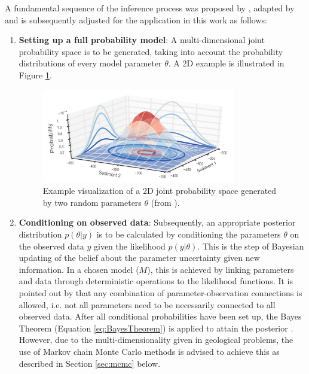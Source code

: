         A fundamental sequence of the inference process was proposed by \citet{gelman2014bayesian}, adapted by \citet{delaVarga2016} and is subsequently adjusted for the application in this work as follows:
        \begin{enumerate}
        	\item \textbf{Setting up a full probability model}: A multi-dimensional joint probability space is to be generated, taking into account the probability distributions of every model parameter $\theta$. A 2D example is illustrated in Figure \ref{fig:joint_prob}.
	        \begin{figure}[h]
				\centering
				\includegraphics[width=0.8\textwidth]{Figures/joint_prob}
				\caption{Example visualization of a 2D joint probability space generated by two random parameters $\theta$ (from \citet{delaVarga2016}).}\label{fig:joint_prob} 
			\end{figure}
        	\item \textbf{Conditioning on observed data}: Subsequently, an appropriate posterior distribution $p(\theta|y)$ is to be calculated by conditioning the parameters $\theta$ on the observed data $y$ given the likelihood $p(y|\theta)$. This is the step of Bayesian updating of the belief about the parameter uncertainty given new information.
        	In a chosen model ($M$), this is achieved by linking parameters and data through deterministic operations to the likelihood functions. It is pointed out by \citet{delaVarga2016} that any combination of parameter-observation connections is allowed, i.e. not all parameters need to be necessarily connected to all observed data. After all conditional probabilities have been set up, the Bayes Theorem (Equation \ref{eq:BayesTheorem}) is applied to attain the posterior \citep{delaVarga2016}. However, due to the multi-dimensionality given in geological problems, the use of Markov chain Monte Carlo methods is advised to achieve this as described in Section \ref{sec:mcmc} below.

\end{enumerate}

